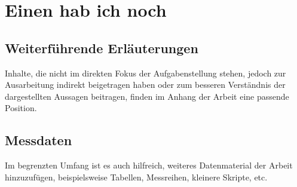 
\chapter{Einen hab ich noch}

\section{Weiterführende Erläuterungen}

Inhalte, die nicht im direkten Fokus der Aufgabenstellung stehen, jedoch zur Ausarbeitung indirekt beigetragen haben oder zum besseren Verständnis der dargestellten Aussagen beitragen, finden im Anhang der Arbeit eine passende Position.

\section{Messdaten}

Im begrenzten Umfang ist es auch hilfreich, weiteres Datenmaterial der Arbeit hinzuzufügen, beispielsweise Tabellen, Messreihen, kleinere Skripte, etc.
